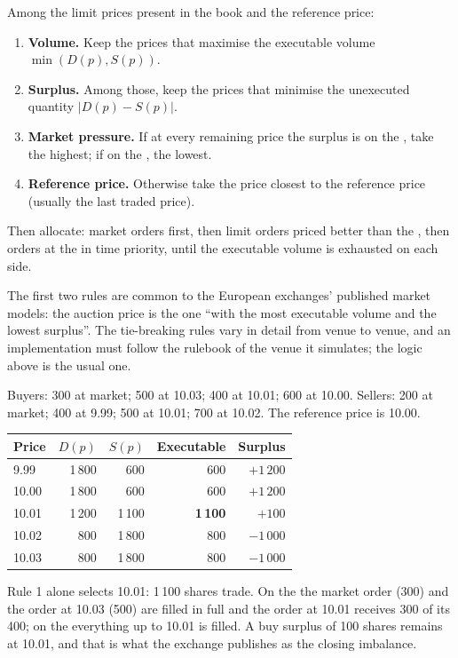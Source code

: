 \begin{method}\label{met:m1:auctions:rules}
Among the limit prices present in the book and the reference price:
\begin{enumerate}
\item \textbf{Volume.} Keep the prices that maximise the executable volume
  $\min(D(p),S(p))$.
\item \textbf{Surplus.} Among those, keep the prices that minimise the
  unexecuted quantity $|D(p) - S(p)|$.
\item \textbf{Market pressure.} If at every remaining price the surplus is on
  the , take the highest; if on the , the lowest.
\item \textbf{Reference price.} Otherwise take the price closest to the
  reference price (usually the last traded price).
\end{enumerate}
Then allocate: market orders first, then limit orders priced better than the
, then orders at the  in time priority, until
the executable volume is exhausted on each side.
\end{method}

The first two rules are common to the European exchanges' published market
models: the auction price is the one ``with the most executable volume and
the lowest surplus''. The tie-breaking rules vary in detail from venue to
venue, and an implementation must follow the rulebook of the venue it
simulates; the logic above is the usual one.

\begin{example}\label{ex:m1:auctions:eight}
Buyers: 300 at market; 500 at 10.03; 400 at 10.01; 600 at 10.00. Sellers: 200
at market; 400 at 9.99; 500 at 10.01; 700 at 10.02. The reference price is
10.00.
\begin{center}\small
\begin{tabular}{@{}lrrrr@{}}
\hline
Price & $D(p)$ & $S(p)$ & Executable & Surplus \\
\hline
9.99 & 1\,800 & 600 & 600 & $+1\,200$ \\
10.00 & 1\,800 & 600 & 600 & $+1\,200$ \\
10.01 & 1\,200 & 1\,100 & \textbf{1\,100} & $+100$ \\
10.02 & 800 & 1\,800 & 800 & $-1\,000$ \\
10.03 & 800 & 1\,800 & 800 & $-1\,000$ \\
\hline
\end{tabular}
\end{center}
Rule 1 alone selects 10.01: 1\,100 shares trade. On the  the market
order (300) and the order at 10.03 (500) are filled in full and the order at
10.01 receives 300 of its 400; on the  everything up to 10.01 is
filled. A buy surplus of 100 shares remains at 10.01, and that is what the
exchange publishes as the closing imbalance.
\end{example}

